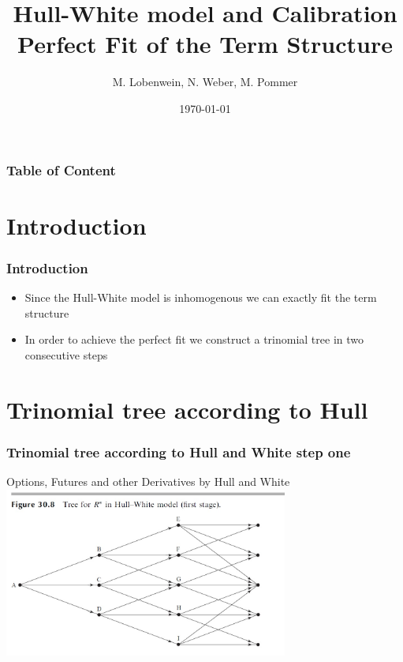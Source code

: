 \documentclass{beamer}
\begin{document}
\title[Hull-White model and calibration]{Hull-White model and Calibration\\
Perfect Fit of the Term Structure}  



\date{\today} 
\author{M. Lobenwein, N. Weber, M. Pommer}



\begin{frame}
\titlepage
\end{frame} 


\begin{frame}
\frametitle[Table of Content]{Table of Content}
\vspace{0.4cm}
\tableofcontents
\end{frame} 


\section{Introduction} 
\begin{frame}
\frametitle{Introduction} 
\begin{itemize}
\item Since the Hull-White model is inhomogenous we can exactly fit the term structure
\item In order to achieve the perfect fit we construct a trinomial tree in two consecutive steps
\end{itemize}
\end{frame}


\section{Trinomial tree according to Hull} 
\begin{frame}
\frametitle{Trinomial tree according to Hull and White step one} 
\begin{block}{Options, Futures and other Derivatives by Hull and White}
\includegraphics[width=0.7\textwidth]{Trinomialbaum hull White step one}
\end{block}

\end{frame}
\end{document}
